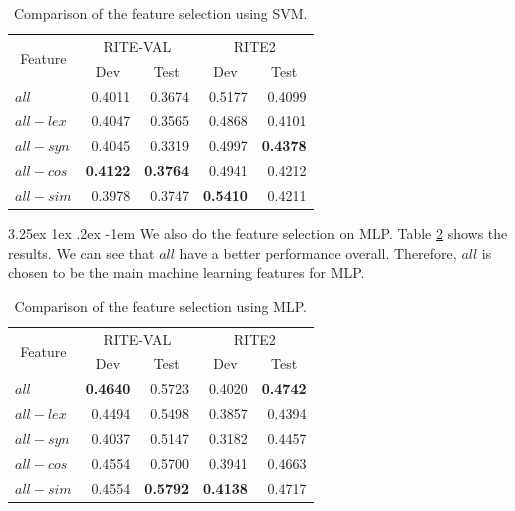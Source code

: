 \documentclass[12pt]{article}
\makeatletter
\renewcommand\paragraph{\@startsection{paragraph}{5}{\z@}%
  {3.25ex \@plus1ex \@minus.2ex}%
  {-1em}%
  {\normalfont\normalsize\bfseries}}
\makeatother
\begin{document}
\begin{CJK*}{UTF8}{bkai}
\begin{spacing}{1.77}
\begin{table}[H]
  \centering
  \setlength{\extrarowheight}{-3pt}
  \caption{Comparison of the feature selection using SVM.}
  \label{result:ft_select}
  \begin{tabular}{|l|r|r|r|r|}
  \hline
  \multicolumn{1}{|c|}{\multirow{2}{*}{Feature}} & \multicolumn{2}{c|}{RITE-VAL} & \multicolumn{2}{c|}{RITE2} \\ \cline{2-5}
  \multicolumn{1}{|c|}{} & \multicolumn{1}{c|}{Dev} & \multicolumn{1}{c|}{Test} & \multicolumn{1}{c|}{Dev} & \multicolumn{1}{c|}{Test} \\ \hline
  $all$ & 0.4011 & 0.3674 & 0.5177 & 0.4099 \\ \hline
  $all - lex$ & 0.4047 & 0.3565 & 0.4868 & 0.4101 \\ \hline
  $all - syn$ & 0.4045 & 0.3319 & 0.4997 & \textbf{0.4378} \\ \hline
  $all - cos$ & \textbf{0.4122} & \textbf{0.3764} & 0.4941 & 0.4212 \\ \hline
  $all - sim$ & 0.3978 & 0.3747 & \textbf{0.5410} & 0.4211 \\ \hline
  \end{tabular}
\end{table}

\paragraph{}
We also do the feature selection on MLP. Table \ref{result:ft_select_mlp} shows the results. We can see that $all$ have a better performance overall. Therefore, $all$ is chosen to be the main machine learning features for MLP.

\begin{table}[H]
  \centering
  \setlength{\extrarowheight}{-3pt}
  \caption{Comparison of the feature selection using MLP.}
  \label{result:ft_select_mlp}
  \begin{tabular}{|l|r|r|r|r|}
  \hline
  \multicolumn{1}{|c|}{\multirow{2}{*}{Feature}} & \multicolumn{2}{c|}{RITE-VAL} & \multicolumn{2}{c|}{RITE2} \\ \cline{2-5}
  \multicolumn{1}{|c|}{} & \multicolumn{1}{c|}{Dev} & \multicolumn{1}{c|}{Test} & \multicolumn{1}{c|}{Dev} & \multicolumn{1}{c|}{Test} \\ \hline
  $all$ & \textbf{0.4640} & 0.5723 & 0.4020 & \textbf{0.4742} \\ \hline
  $all - lex$ & 0.4494 & 0.5498 & 0.3857 & 0.4394 \\ \hline
  $all - syn$ & 0.4037 & 0.5147 & 0.3182 & 0.4457 \\ \hline
  $all - cos$ & 0.4554 & 0.5700 & 0.3941 & 0.4663 \\ \hline
  $all - sim$ & 0.4554 & \textbf{0.5792} & \textbf{0.4138} & 0.4717 \\ \hline
  \end{tabular}
\end{table}


\end{spacing}
\end{CJK*}
\end{document}
